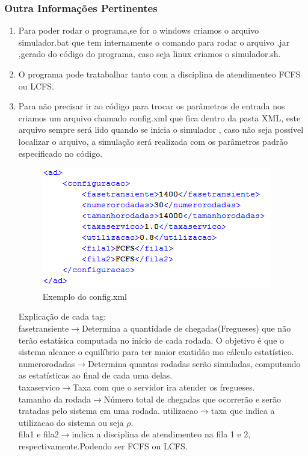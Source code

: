 \documentclass[a4paper,10pt]{article}
\begin{document}
	\subsubsection{Outra Informações Pertinentes}
	\begin{enumerate}
	 \item Para poder rodar o programa,se for o windows criamos o arquivo simulador.bat  que tem internamente o comando para rodar o arquivo .jar ,gerado do código do programa, caso seja linux criamos o simulador.sh.
	 \item O programa pode tratabalhar tanto com a disciplina de atendimenteo FCFS ou LCFS.
	 \item Para não precisar ir ao código para trocar os parâmetros de entrada nos criamos um arquivo chamado config.xml que fica dentro da pasta XML, este arquivo sempre será lido quando se inicia o simulador , caso não seja 
	  possível localizar o arquivo, a simulação será realizada com os parâmetros padrão especificado no código.
	  \begin{figure}[H]
	      \center
	      \includegraphics[scale=0.75]{Capturar.PNG}
	      \caption{Exemplo do config.xml}
	  \end{figure}
	  Explicação de cada tag:\\
	  fasetransiente$\to$Determina a quantidade de chegadas(Fregueses) que não terão estatísica  computada no início de cada rodada. O objetivo é que o sistema alcance o equilíbrio para ter maior exatidão mo cálculo estatístico.\\
	  numerorodadas$\to$Determina quantas rodadas serão simuladas, computando as estatísticas ao final de cada uma delas.\\
	  taxaservico$\to$Taxa com que o servidor ira atender os fregueses.\\
	  tamanho da rodada$\to$Número total de chegadas que ocorrerão e serão tratadas pelo sistema em uma rodada.
	  utilizacao$\to$taxa que indica a utilizacao do sistema ou seja $\rho$.\\
	  fila1 e fila2$\to$indica a disciplina de atendimenteo na fila 1 e 2, respectivamente.Podendo ser FCFS ou LCFS.\\
	\end{enumerate}
\end{document}
